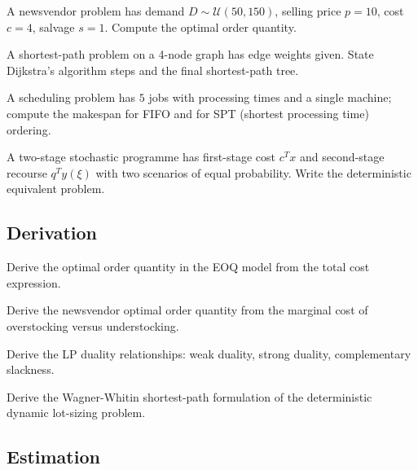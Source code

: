 \begin{exercise}
A newsvendor problem has demand $D \sim \mathcal{U}(50, 150)$, selling price $p = 10$, cost $c = 4$, salvage $s = 1$. Compute the optimal order quantity.
\end{exercise}

\begin{exercise}
A shortest-path problem on a 4-node graph has edge weights given. State Dijkstra's algorithm steps and the final shortest-path tree.
\end{exercise}

\begin{exercise}
A scheduling problem has $5$ jobs with processing times and a single machine; compute the makespan for FIFO and for SPT (shortest processing time) ordering.
\end{exercise}

\begin{exercise}
A two-stage stochastic programme has first-stage cost $c^T x$ and second-stage recourse $q^T y(\xi)$ with two scenarios of equal probability. Write the deterministic equivalent problem.
\end{exercise}

\subsection*{Derivation}

\begin{exercise}
Derive the optimal order quantity in the EOQ model from the total cost expression.
\end{exercise}

\begin{exercise}
Derive the newsvendor optimal order quantity from the marginal cost of overstocking versus understocking.
\end{exercise}

\begin{exercise}
Derive the LP duality relationships: weak duality, strong duality, complementary slackness.
\end{exercise}

\begin{exercise}
Derive the Wagner-Whitin shortest-path formulation of the deterministic dynamic lot-sizing problem.
\end{exercise}

\subsection*{Estimation}

